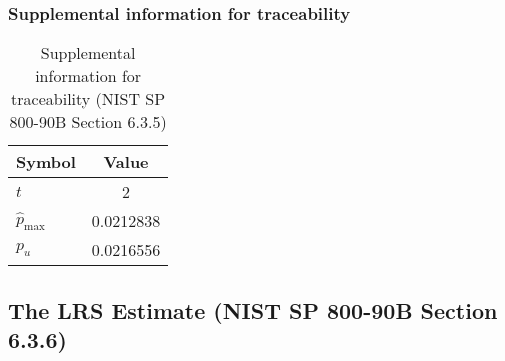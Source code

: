 \documentclass[a3paper,xelatex,english]{bxjsarticle}
\begin{document}
\subsubsection{Supplemental information for traceability}
\renewcommand{\arraystretch}{1.8}
\begin{table}[h]
\caption{Supplemental information for traceability (NIST SP 800-90B Section 6.3.5)}
\begin{center}
\begin{tabular}{|l|c|}
\hline 
\rowcolor{anotherlightblue} %
Symbol				& Value \\ \hline 
$t$				&        2\\ \hline 
$\hat{p}_{\textrm{max}}$ 			& 0.0212838\\ \hline
$p_u$				& 0.0216556\\ \hline
\end{tabular}
\end{center}
\end{table}
\renewcommand{\arraystretch}{1.4}
\clearpage
\subsection{The LRS Estimate (NIST SP 800-90B Section 6.3.6)}\label{sec:NonBinary636}
\end{document}
